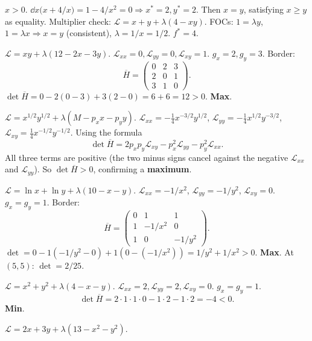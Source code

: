 \begin{solutions}
        $x > 0$. $\dd{}{x}\bigl(x + 4/x\bigr) = 1 - 4/x^2 = 0
        \Rightarrow x^* = 2, y^* = 2$. Then $x = y$, satisfying
        $x \geq y$ as equality. Multiplier check:
        $\mathcal{L} = x + y + \lambda(4 - x y)$. FOCs:
        $1 = \lambda y$, $1 = \lambda x \Rightarrow x = y$ (consistent),
        $\lambda = 1/x = 1/2$. $f^* = 4$.
  \item $\mathcal{L} = x y + \lambda(12 - 2 x - 3 y)$.
        $\mathcal{L}_{xx} = 0, \mathcal{L}_{yy} = 0,
        \mathcal{L}_{xy} = 1$. $g_x = 2, g_y = 3$. Border:
        \[
        \overline{H} = \begin{pmatrix} 0 & 2 & 3 \\ 2 & 0 & 1 \\
        3 & 1 & 0 \end{pmatrix}.
        \]
        $\det \overline{H} = 0 - 2(0 - 3) + 3(2 - 0) = 6 + 6 = 12 > 0$.
        \textbf{Max}. \checkmark
  \item $\mathcal{L} = x^{1/2} y^{1/2} + \lambda(M - p_x x - p_y y)$.
        $\mathcal{L}_{xx} = -\tfrac{1}{4} x^{-3/2} y^{1/2}$,
        $\mathcal{L}_{yy} = -\tfrac{1}{4} x^{1/2} y^{-3/2}$,
        $\mathcal{L}_{xy} = \tfrac{1}{4} x^{-1/2} y^{-1/2}$. Using the
        formula
        \[\det \overline{H} = 2 p_x p_y \mathcal{L}_{xy}
        - p_x^2 \mathcal{L}_{yy} - p_y^2 \mathcal{L}_{xx}.\]
        All three terms are positive (the two minus signs cancel against
        the negative $\mathcal{L}_{xx}$ and $\mathcal{L}_{yy}$). So
        $\det \overline{H} > 0$, confirming a \textbf{maximum}.
  \item $\mathcal{L} = \ln x + \ln y + \lambda(10 - x - y)$.
        $\mathcal{L}_{xx} = -1/x^2$, $\mathcal{L}_{yy} = -1/y^2$,
        $\mathcal{L}_{xy} = 0$. $g_x = g_y = 1$. Border:
        \[
        \overline{H} = \begin{pmatrix} 0 & 1 & 1 \\ 1 & -1/x^2 & 0 \\
        1 & 0 & -1/y^2 \end{pmatrix}.
        \]
        $\det = 0 - 1(-1/y^2 - 0) + 1(0 - (-1/x^2))
        = 1/y^2 + 1/x^2 > 0$. \textbf{Max}. At $(5,5)$: $\det = 2/25$.
  \item $\mathcal{L} = x^2 + y^2 + \lambda(4 - x - y)$.
        $\mathcal{L}_{xx} = 2, \mathcal{L}_{yy} = 2,
        \mathcal{L}_{xy} = 0$. $g_x = g_y = 1$.
        \[\det \overline{H} = 2 \cdot 1 \cdot 1 \cdot 0 - 1 \cdot 2
        - 1 \cdot 2 = -4 < 0.\] \textbf{Min}. \checkmark
  \item $\mathcal{L} = 2 x + 3 y + \lambda(13 - x^2 - y^2)$.

\end{solutions}
